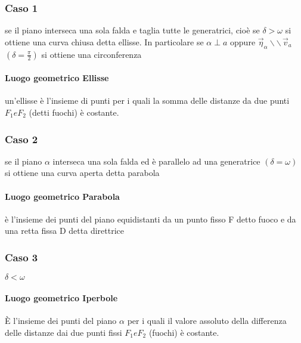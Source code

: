 \documentclass[a4paper,11pt]{article}
\begin{document}
\subsubsection{Caso 1}
se il piano interseca una sola falda e taglia tutte le generatrici, cioè se \( \delta > \omega \) si ottiene una curva chiusa detta ellisse. 
In particolare se \( \alpha \perp a \) oppure \( \vec{\eta}_\alpha \backslash \backslash \, \vec{v}_a \)   \( (\delta = \frac{\pi}{2}) \) si ottiene una circonferenza
\paragraph{Luogo geometrico Ellisse}
un'ellisse è l'insieme di punti per i quali la somma delle distanze da due punti \(F_1 e F_2\) (detti fuochi) è costante.





\subsubsection{Caso 2}
se il piano \( \alpha \) interseca una sola falda ed è parallelo ad una generatrice \( ( \delta = \omega) \) si ottiene una curva aperta detta parabola
\paragraph{Luogo geometrico Parabola}
è l'insieme dei punti del piano equidistanti da un punto fisso F detto fuoco e da una retta fissa D detta direttrice






\subsubsection{Caso 3}

\(  \delta < \omega \)



\paragraph{Luogo geometrico Iperbole}
È l'insieme dei punti del piano \( \alpha \) per i quali il valore assoluto della differenza delle distanze dai due punti fissi \( F_1 e F_2\) (fuochi) è costante.
  
\end{document}
